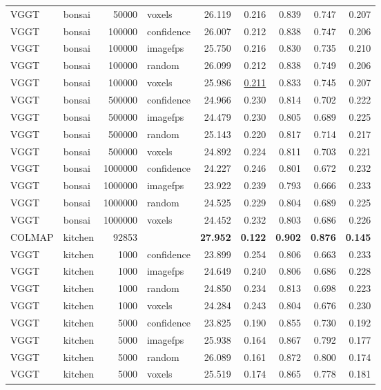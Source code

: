 \begin{table}[H]
\begin{tabular}{llrlrrrrr}
VGGT & bonsai & 50000 & voxels & 26.119 & 0.216 & 0.839 & 0.747 & 0.207 \\
VGGT & bonsai & 100000 & confidence & 26.007 & 0.212 & 0.838 & 0.747 & 0.206 \\
VGGT & bonsai & 100000 & imagefps & 25.750 & 0.216 & 0.830 & 0.735 & 0.210 \\
VGGT & bonsai & 100000 & random & 26.099 & 0.212 & 0.838 & 0.749 & 0.206 \\
VGGT & bonsai & 100000 & voxels & 25.986 & \underline{0.211} & 0.833 & 0.745 & 0.207 \\
VGGT & bonsai & 500000 & confidence & 24.966 & 0.230 & 0.814 & 0.702 & 0.222 \\
VGGT & bonsai & 500000 & imagefps & 24.479 & 0.230 & 0.805 & 0.689 & 0.225 \\
VGGT & bonsai & 500000 & random & 25.143 & 0.220 & 0.817 & 0.714 & 0.217 \\
VGGT & bonsai & 500000 & voxels & 24.892 & 0.224 & 0.811 & 0.703 & 0.221 \\
VGGT & bonsai & 1000000 & confidence & 24.227 & 0.246 & 0.801 & 0.672 & 0.232 \\
VGGT & bonsai & 1000000 & imagefps & 23.922 & 0.239 & 0.793 & 0.666 & 0.233 \\
VGGT & bonsai & 1000000 & random & 24.525 & 0.229 & 0.804 & 0.689 & 0.225 \\
VGGT & bonsai & 1000000 & voxels & 24.452 & 0.232 & 0.803 & 0.686 & 0.226 \\
\midrule
COLMAP & kitchen & 92853 &  & \textbf{27.952} & \textbf{0.122} & \textbf{0.902} & \textbf{0.876} & \textbf{0.145} \\
VGGT & kitchen & 1000 & confidence & 23.899 & 0.254 & 0.806 & 0.663 & 0.233 \\
VGGT & kitchen & 1000 & imagefps & 24.649 & 0.240 & 0.806 & 0.686 & 0.228 \\
VGGT & kitchen & 1000 & random & 24.850 & 0.234 & 0.813 & 0.698 & 0.223 \\
VGGT & kitchen & 1000 & voxels & 24.284 & 0.243 & 0.804 & 0.676 & 0.230 \\
VGGT & kitchen & 5000 & confidence & 23.825 & 0.190 & 0.855 & 0.730 & 0.192 \\
VGGT & kitchen & 5000 & imagefps & 25.938 & 0.164 & 0.867 & 0.792 & 0.177 \\
VGGT & kitchen & 5000 & random & 26.089 & 0.161 & 0.872 & 0.800 & 0.174 \\
VGGT & kitchen & 5000 & voxels & 25.519 & 0.174 & 0.865 & 0.778 & 0.181 \\

\end{tabular}
\end{table}
